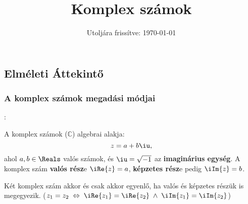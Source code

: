 \documentclass[a4paper, 12pt]{scrartcl}
\title{Komplex számok}
\date{Utoljára frissítve: \today}
\begin{document}
\maketitle

\subsection{Elméleti Áttekintő}

\subsubsection{A komplex számok megadási módjai}

\begin{blueBox}
  :

  \begin{minipage}{.6\textwidth}
    A komplex számok ($\mathbb C$) algebrai alakja:
    \[
      z = a + b\iu
      \text,
    \]
    ahol $a, b \in \Reals$ valós számok, és $\iu = \sqrt{-1}$ az
    \textbf{imaginárius egység}. A komplex szám \textbf{valós rész}e
    $\iRe \{z\} = a$, \textbf{képzetes rész}e pedig $\iIm \{z\} = b$.
  \end{minipage}\begin{minipage}{.4\textwidth}
    \flushright
  \end{minipage}
\end{blueBox}

\begin{note}
  Két komplex szám akkor és csak akkor egyenlő, ha valós és képzetes részük is
  megegyezik. ($z_1 = z_2 \; \Leftrightarrow \; \iRe \{z_1\} = \iRe \{z_2\} \;
    \land \; \iIm \{z_1\} = \iIm\{z_2\}$)
\end{note}
\end{document}
